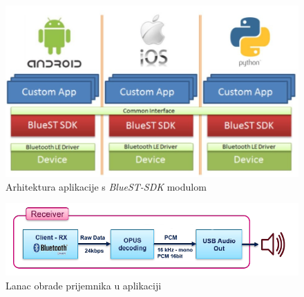 \begin{figure}[ht]
	\includegraphics[width=\linewidth]{imgs/bluest_stack}
	\caption{Arhitektura aplikacije s \textit{BlueST-SDK} modulom}
	\label{fig:bluest_stack}
\end{figure}
\begin{figure}[ht]
	\includegraphics[width=\linewidth]{imgs/duplex_chain_2}
	\caption{Lanac obrade prijemnika u aplikaciji}
	\label{fig:duplex_chain_2}
\end{figure}